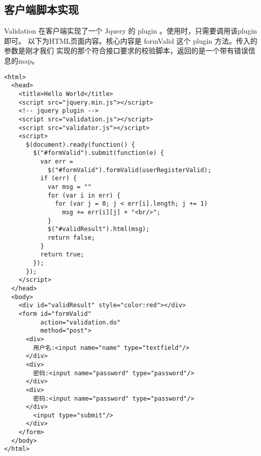 \subsection{客户端脚本实现}
Validation 在客户端实现了一个 Jquery 的 plugin 。使用时，只需要调用该plugin即可。
以下为HTML页面内容。核心内容是 formValid 这个 plugin 方法。传入的参数是刚才我们
实现的那个符合接口要求的校验脚本，返回的是一个带有错误信息的map。

\begin{verbatim}
<html>
  <head>
    <title>Hello World</title>
    <script src="jquery.min.js"></script>
    <!-- jquery plugin -->
    <script src="validation.js"></script>
    <script src="validator.js"></script>
    <script>
      $(document).ready(function() {
        $("#formValid").submit(function(e) {
          var err = 
            $("#formValid").formValid(userRegisterValid);
          if (err) {
            var msg = ""
            for (var i in err) {
              for (var j = 0; j < err[i].length; j += 1)
                msg += err[i][j] + "<br/>";
            }
            $("#validResult").html(msg);
            return false;
          }
          return true;
        });
      });
    </script>
  </head>
  <body>
    <div id="validResult" style="color:red"></div>
    <form id="formValid" 
          action="validation.do" 
          method="post">
      <div>
        用户名:<input name="name" type="textfield"/>
      </div>
      <div>
        密码:<input name="password" type="password"/>
      </div>
      <div>
        密码:<input name="password" type="password"/>
      </div>
        <input type="submit"/>
      </div>
    </form>
  </body> 
</html>
\end{verbatim}

